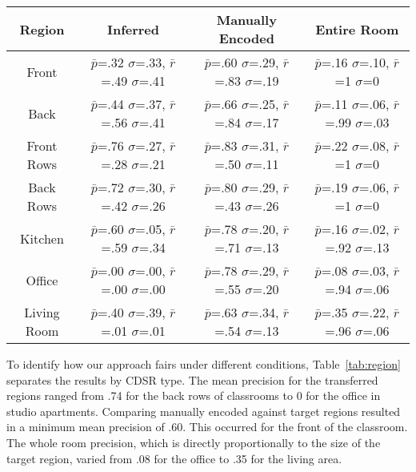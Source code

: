 \begin{table*}
	\center
\begin{tabular}{|c|c|c|c|}
\hline
Region & Inferred & Manually Encoded & Entire Room \\
\hline
Front & $\bar{p}$=.32 $\sigma$=.33, $\bar{r}$=.49 $\sigma$=.41 & $\bar{p}$=.60 $\sigma$=.29, $\bar{r}$=.83 $\sigma$=.19  & $\bar{p}$=.16 $\sigma$=.10, $\bar{r}$=1 $\sigma$=0  \\
\hline
Back & $\bar{p}$=.44 $\sigma$=.37, $\bar{r}$=.56 $\sigma$=.41 & $\bar{p}$=.66 $\sigma$=.25, $\bar{r}$=.84 $\sigma$=.17  & $\bar{p}$=.11 $\sigma$=.06, $\bar{r}$=.99 $\sigma$=.03  \\
\hline
Front Rows & $\bar{p}$=.76 $\sigma$=.27, $\bar{r}$=.28 $\sigma$=.21 & $\bar{p}$=.83 $\sigma$=.31, $\bar{r}$=.50 $\sigma$=.11  & $\bar{p}$=.22 $\sigma$=.08, $\bar{r}$=1 $\sigma$=0  \\
\hline
Back Rows & $\bar{p}$=.72 $\sigma$=.30, $\bar{r}$=.42 $\sigma$=.26 & $\bar{p}$=.80 $\sigma$=.29, $\bar{r}$=.43 $\sigma$=.26  & $\bar{p}$=.19 $\sigma$=.06, $\bar{r}$=1 $\sigma$=0  \\
\hline
Kitchen & $\bar{p}$=.60 $\sigma$=.05, $\bar{r}$=.59 $\sigma$=.34 & $\bar{p}$=.78 $\sigma$=.20, $\bar{r}$=.71 $\sigma$=.13  & $\bar{p}$=.16 $\sigma$=.02, $\bar{r}$=.92 $\sigma$=.13  \\
\hline
Office & $\bar{p}$=.00 $\sigma$=.00, $\bar{r}$=.00 $\sigma$=.00 & $\bar{p}$=.78 $\sigma$=.29, $\bar{r}$=.55 $\sigma$=.20  & $\bar{p}$=.08 $\sigma$=.03, $\bar{r}$=.94 $\sigma$=.06  \\
\hline
Living Room & $\bar{p}$=.40 $\sigma$=.39, $\bar{r}$=.01 $\sigma$=.01 & $\bar{p}$=.63 $\sigma$=.34, $\bar{r}$=.54 $\sigma$=.13  & $\bar{p}$=.35 $\sigma$=.22, $\bar{r}$=.96 $\sigma$=.06  \\
\hline
\end{tabular}
\caption{Performance by Region Type}
  \label{tab:region}	
\end{table*}


To identify how our approach fairs under different conditions, Table~\ref{tab:region} separates the results by CDSR type. The mean precision for the transferred regions ranged from .74 for the back rows of classrooms to 0 for the office in studio apartments. Comparing manually encoded against  target regions resulted in a minimum mean precision of .60. This occurred for the front of the classroom. The whole room precision, which is directly proportionally to the size of the target region, varied from .08 for the office to .35 for the living area.

